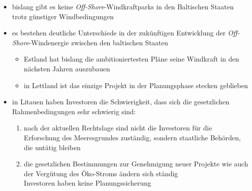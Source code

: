 \documentclass[11pt,a4paper]{article}
\begin{document}
\begin{itemize}

\item bislang gibt es keine \textsl{Off-Shore}-Windkraftparks in den Baltischen Staaten trotz günstiger Windbedingungen

\item es bestehen deutliche Unterschiede in der zukünftigen Entwicklung der \textsl{Off-Shore}-Windenergie zwischen den baltischen Staaten

	\begin{itemize}

	\item Estland hat bislang die ambitioniertesten Pläne seine Windkraft in den nächsten Jahren auszubauen
	
	\item in Lettland ist das einzige Projekt in der Planungsphase stecken geblieben

	\end{itemize}

\item in Litauen haben Investoren die Schwierigkeit, dass sich die gesetzlichen Rahmenbedingungen sehr schwierig sind:

	\begin{enumerate}

		\item nach der aktuellen Rechtslage sind nicht die Investoren für die Erforschung des Meeresgrundes zuständig, sondern staatliche Behörden, die untätig bleiben
		
		\item die gesetzlichen Bestimmungen zur Genehmigung neuer Projekte wie auch der Vergütung des Öko-Stroms ändern sich ständig\\
		 Investoren haben keine Planungssicherung
			
	\end{enumerate}	

\end{itemize}
\end{document}
